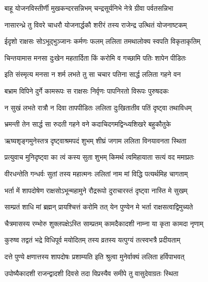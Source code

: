 \twolineshloka
{बाहू योजनविस्तीर्णी मुखकन्दरसन्निभम्}
{चन्द्रसूर्यनिभे नेत्रे ग्रीवा पर्वतसन्निभा} %

\twolineshloka
{नासारन्ध्रे तु विवरे चाधरौ योजनार्द्धकौ}
{शरीरं तस्य राजेन्द्र उत्थितं योजनाष्टकम्} %

\twolineshloka
{ईदृशो राक्षसः सोऽभूद्भुञ्जानः कर्मणः फलम्}
{ललिता तमथालोक्य स्वपति विकृताकृतिम्} %

\twolineshloka
{चिन्तयामास मनसा दुःखेन महतार्दिता}
{किं करोमि व गच्छामि पतिः शापेन पीडितः} %

\twolineshloka
{इति संस्मृत्य मनसा न शर्म लभते तु सा}
{चचार पतिना सार्द्ध ललिता गहने वन} %

\twolineshloka
{बभ्राम विपिने दुर्गे कामरूपः स राक्षसः}
{निर्वृणः पापनिरतो विरूपः पुरुषदकः} %

\twolineshloka
{न सुखं लभते रात्रौ न दिवा तापपीडितः}
{ललिता दुःखितातीव पतिं दृष्ट्वा तथाविधम्} %

\twolineshloka
{भ्रमन्ती तेन सार्द्ध सा रुदती गहने वने}
{कदाचिदगमद्विन्ध्यशिखरे बहुकौतुके} %

\twolineshloka
{ऋष्यशृङ्गमुनेस्तत्र दृष्ट्वाश्रमपदं शुभम्}
{शीघ्रं जगाम ललिता विनयावनता स्थिता} %

\twolineshloka
{प्रत्युवाच मुनिदृष्ट्वा का त्वं कस्य सुता शुभम्}
{किमर्थ त्वमिहायाता सत्यं वद ममाप्रतः} %


\twolineshloka
{वीरधन्तेति गन्धर्वः सुतां तस्य महात्मनः}
{ललितां नाम मां विद्धि पत्यर्थमिह चागताम्} %

\twolineshloka
{भर्ता में शापदोषेण राक्षसोऽभून्महामुने}
{रौद्ररूपो दुराचारस्तं दृष्ट्वा नास्ति मे सुखम्} %

\twolineshloka
{साम्प्रतं शाधि मां ब्रह्मन् प्रायश्चित्तं करोमि तत्}
{येन पुण्येन मे भर्ता राक्षसत्वाद्विमुच्यते} %


\twolineshloka
{चैत्रमासस्य रम्भोरु शुक्लपक्षेऽस्ति साम्प्रतम्}
{कामदैकादशी नाम्ना या कृता कामदा नृणाम्} %

\twolineshloka
{कुरुष्व तद्वतं भद्रे विधिपूर्व मयोदितम्}
{तस्य व्रतस्य यत्पुग्यं तत्स्वभत्रै प्रदीयताम्} %

\twolineshloka
{दत्ते पुण्ये क्षणात्तस्य शापदोषः प्रशाम्यति}
{इति श्रुत्वा मुनेर्वाक्यं ललिता हर्विपाभवत्} %

\twolineshloka
{उपोष्यैकादशी राजन्द्वादशी दिवसे तदा}
{विप्रस्यैव समीपे तु वासुदेवाग्रतः स्थिता} %

